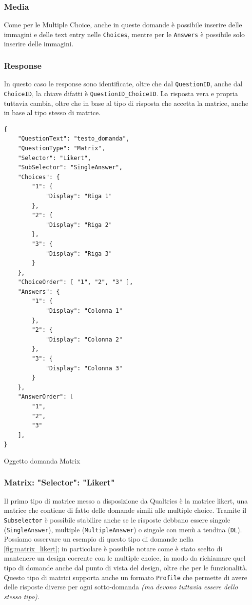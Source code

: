 \subsubsection{Media}
Come per le Multiple Choice, anche in queste domande è possibile inserire delle immagini e delle text entry nelle \texttt{Choices}, mentre per le \texttt{Answers} è possibile solo inserire delle immagini.

\subsubsection{Response}
In questo caso le response sono identificate, oltre che dal \texttt{QuestionID}, anche dal \texttt{ChoiceID}, la chiave difatti è \texttt{QuestionID\_ChoiceID}. La risposta vera e propria tuttavia cambia, oltre che in base al tipo di risposta che accetta la matrice, anche in base al tipo stesso di matrice.

\newpage
\begin{json}
\begin{verbatim}
{
    "QuestionText": "testo_domanda",
    "QuestionType": "Matrix",
    "Selector": "Likert",
    "SubSelector": "SingleAnswer",
    "Choices": {
        "1": {
            "Display": "Riga 1"
        },
        "2": {
            "Display": "Riga 2"
        },
        "3": {
            "Display": "Riga 3"
        }
    },
    "ChoiceOrder": [ "1", "2", "3" ],
    "Answers": {
        "1": {
            "Display": "Colonna 1"
        },
        "2": {
            "Display": "Colonna 2"
        },
        "3": {
            "Display": "Colonna 3"
        }
    },
    "AnswerOrder": [
        "1",
        "2",
        "3"
    ],
}
\end{verbatim}
\caption{Oggetto domanda Matrix}
\label{json:matrix}
\end{json}

\subsubsection{Matrix: "Selector": "Likert"}
Il primo tipo di matrice messo a disposizione da Qualtrics è la matrice likert, una matrice che contiene di fatto delle domande simili alle multiple choice. Tramite il \texttt{Subselector} è possibile stabilire anche se le risposte debbano essere singole (\texttt{SingleAnswer}), multiple (\texttt{MultipleAnswer}) o singole con menù a tendina (\texttt{DL}). Possiamo osservare un esempio di questo tipo di domande nella \autoref{fig:matrix_likert}; in particolare è possibile notare come è stato scelto di mantenere un design coerente con le multiple choice, in modo da richiamare quel tipo di domande anche dal punto di vista del design, oltre che per le funzionalità. Questo tipo di matrici supporta anche un formato \texttt{Profile} che permette di avere delle risposte diverse per ogni sotto-domanda \textit{(ma devono tuttavia essere dello stesso tipo)}.


